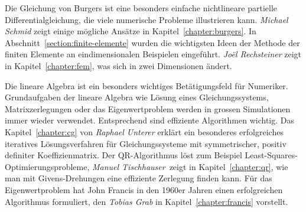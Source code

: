 Die Gleichung von Burgers ist eine besonders einfache nichtlineare
partielle Differentialgleichung, die viele numerische Probleme
illustrieren kann.
{\em Michael Schmid} zeigt einige mögliche Ansätze in
Kapitel~\ref{chapter:burgers}.
In Abschnitt~\ref{section:finite-elemente} wurden die wichtigsten Ideen
der Methode der finiten Elemente an eindimensionalen Beispielen eingeführt.
{\em Joël Rechsteiner} zeigt in Kapitel~\ref{chapter:fem}, was sich in
zwei Dimensionen ändert.

Die lineare Algebra ist ein besonders wichtiges Betätigungsfeld für
Numeriker.
Grundaufgaben der lineare Algebra wie Lösung eines Gleichungssystems,
Matrixzerlegungen oder das Eigenwertproblem werden in grossen
Simulationen immer wieder verwendet.
Entsprechend sind effiziente Algorithmen wichtig.
Das Kapitel~\ref{chapter:cg} von {\em Raphael Unterer} erklärt
ein besonderes erfolgreiches iteratives
Lösungsverfahren für Gleichungssysteme mit symmetrischer, positiv
definiter Koeffizienmatrix.
Der QR-Algorithmus löst zum Beispiel Least-Squares-Optimierungsprobleme,
{\em Manuel Tischhauser} zeigt in Kapitel~\ref{chapter:qr}, wie man mit
Givens-Drehungen eine effiziente Zerlegung finden kann.
Für das Eigenwertproblem hat John Francis in den 1960er Jahren einen
erfolgreichen Algorithmus formuliert, den {\em Tobias Grab} in
Kapitel~\ref{chapter:francis} vorstellt.






